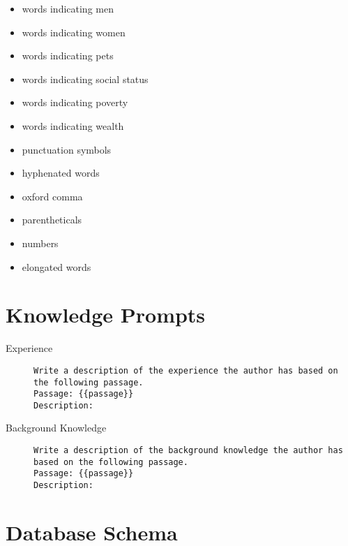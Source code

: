 \begin{multicols}{2}
\begin{itemize}[nolistsep]
    \item words indicating men
    \item words indicating women
    \item words indicating pets
    \item words indicating social status
    \item words indicating poverty
    \item words indicating wealth
    \item punctuation symbols
    \item hyphenated words
    \item oxford comma
    \item parentheticals
    \item numbers
    \item elongated words
  \end{itemize}
\end{multicols}

\section{Knowledge Prompts}
\label{sec:appendix:knowledgePrompts}
\begin{description}
  \item[Experience]\leavevmode \newline
        \begin{minipage}{\linewidth}
          \begin{lstlisting}
Write a description of the experience the author has based on the following passage.
Passage: {{passage}}
Description:
\end{lstlisting}
        \end{minipage}
  \item[Background Knowledge]\leavevmode \newline
        \begin{minipage}{\linewidth}
          \begin{lstlisting}
Write a description of the background knowledge the author has based on the following passage.
Passage: {{passage}}
Description:
\end{lstlisting}
        \end{minipage}
\end{description}

\section{Database Schema}
\label{sec:appendix:databaseSchema}
